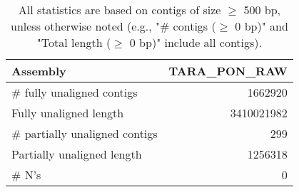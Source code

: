 \documentclass[12pt,a4paper]{article}
\begin{document}
\begin{table}[ht]
\begin{center}
\caption{All statistics are based on contigs of size $\geq$ 500 bp, unless otherwise noted (e.g., "\# contigs ($\geq$ 0 bp)" and "Total length ($\geq$ 0 bp)" include all contigs).}
\begin{tabular}{|l*{1}{|r}|}
\hline
Assembly & TARA\_PON\_RAW \\ \hline
\# fully unaligned contigs & 1662920 \\ \hline
Fully unaligned length & 3410021982 \\ \hline
\# partially unaligned contigs & 299 \\ \hline
Partially unaligned length & 1256318 \\ \hline
\# N's & 0 \\ \hline
\end{tabular}
\end{center}
\end{table}
\end{document}
